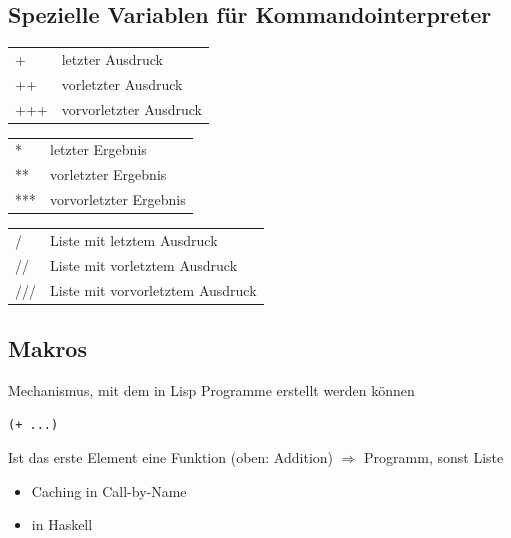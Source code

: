 		\begin{figure}[H]
		\end{figure}




\subsection{Spezielle Variablen für Kommandointerpreter} %
\label{sub:spezielle_variablen_fuer_kommandointerpreter}

	\begin{tabular}{ll}
	+	&	letzter Ausdruck	\\
	++	&	vorletzter Ausdruck	\\
	+++	&	vorvorletzter Ausdruck
	\end{tabular}

	\begin{tabular}{ll}
	*	&	letzter Ergebnis	\\
	**	&	vorletzter Ergebnis	\\
	***	&	vorvorletzter Ergebnis
	\end{tabular}

	\begin{tabular}{ll}
	/	&	Liste mit letztem Ausdruck	\\
	//	&	Liste mit vorletztem Ausdruck	\\
	///	&	Liste mit vorvorletztem Ausdruck
	\end{tabular}

\subsection{Makros} %
\label{sub:makros}

	Mechanismus, mit dem in Lisp Programme erstellt werden können\\
	\begin{lstlisting}
(+ ...)
	\end{lstlisting}

	Ist das erste Element eine Funktion (oben: Addition) $\Rightarrow$ Programm, sonst Liste
	\begin{itemize}
				\item Caching in Call-by-Name
				\item in Haskell
			\end{itemize}

